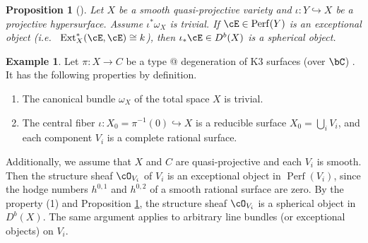\documentclass[12pt]{amsart}
\makeatletter
\numberwithin{equation}{section}
\theoremstyle{plain}
\newtheorem{proposition}[theorem]{Proposition}
\theoremstyle{definition}
\newtheorem{example}[theorem]{Example}
\DeclareMathOperator{\Perf}{\mathrm{Perf}}
\DeclareMathOperator{\Ext}{\mathrm{Ext}}
\newcommand*{\rom}[1]{\expandafter\@slowromancap\romannumeral #1@}
\makeatother
\begin{document}
\begin{proposition}[{\cite[Proposition 3.15]{MR1831820}}]\label{prop:exceptional-to-spherical}
    Let $X$ be a smooth quasi-projective variety and $\iota \colon Y \hookrightarrow X$ be a projective hypersurface.
    Assume $\iota^*\omega_X$ is trivial.
    If $\cE \in \Perf(Y)$ is an \emph{exceptional object} (i.e.~ $\Ext^*_X(\cE, \cE) \cong k$), then $\iota_* \cE \in D^b(X)$ is a spherical object.
\end{proposition}
\begin{example}\label{ex:spherical-object-from-K3-degeneration}
    Let $\pi \colon X \to C$ be a type \rom{3} degeneration of K3 surfaces (over $\bC$) \cite{}.
    It has the following properties by definition.
    \begin{enumerate}
        \item The canonical bundle $\omega_X$ of the total space $X$ is trivial.
        \item The central fiber $\iota \colon X_0 = \pi^{-1}(0) \hookrightarrow X$ is a reducible surface $X_0 = \bigcup_i V_i$, and each component $V_i$ is a complete rational surface.
    \end{enumerate}
    Additionally, we assume that $X$ and $C$ are quasi-projective and each $V_i$ is smooth.
    Then the structure sheaf $\cO_{V_i}$ of $V_i$ is an exceptional object in $\Perf(V_i)$, since the hodge numbers $h^{0,1}$ and $h^{0,2}$ of a smooth rational surface are zero.
    By the property (1) and Proposition \ref{prop:exceptional-to-spherical}, the structure sheaf $\cO_{V_i}$ is a spherical object in $D^b(X)$.
    The same argument applies to arbitrary line bundles (or exceptional objects) on $V_i$.


\end{example}
\end{document}
